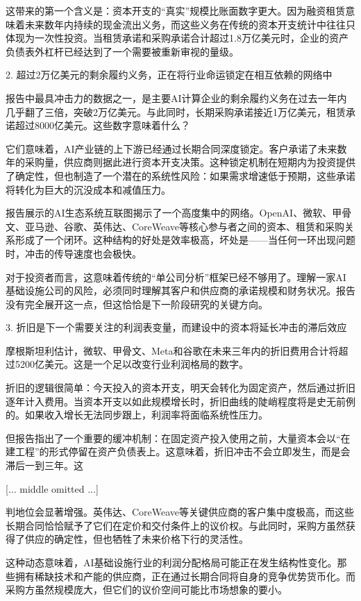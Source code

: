 \documentclass[11pt]{ctexart}
\begin{document}
这带来的第一个含义是：资本开支的“真实”规模比账面数字更大。因为融资租赁意味着未来数年内持续的现金流出义务，而这些义务在传统的资本开支统计中往往只体现为一次性投资。当租赁承诺和采购承诺合计超过1.8万亿美元时，企业的资产负债表外杠杆已经达到了一个需要被重新审视的量级。

2. 超过2万亿美元的剩余履约义务，正在将行业命运锁定在相互依赖的网络中

报告中最具冲击力的数据之一，是主要AI计算企业的剩余履约义务在过去一年内几乎翻了三倍，突破2万亿美元。与此同时，长期采购承诺接近1万亿美元，租赁承诺超过8000亿美元。这些数字意味着什么？

它们意味着，AI产业链的上下游已经通过长期合同深度锁定。客户承诺了未来数年的采购量，供应商则据此进行资本开支决策。这种锁定机制在短期内为投资提供了确定性，但也制造了一个潜在的系统性风险：如果需求增速低于预期，这些承诺将转化为巨大的沉没成本和减值压力。

报告展示的AI生态系统互联图揭示了一个高度集中的网络。OpenAI、微软、甲骨文、亚马逊、谷歌、英伟达、CoreWeave等核心参与者之间的资本、租赁和采购关系形成了一个闭环。这种结构的好处是效率极高，坏处是——当任何一环出现问题时，冲击的传导速度也会极快。

对于投资者而言，这意味着传统的“单公司分析”框架已经不够用了。理解一家AI基础设施公司的风险，必须同时理解其客户和供应商的承诺规模和财务状况。报告没有完全展开这一点，但这恰恰是下一阶段研究的关键方向。

3. 折旧是下一个需要关注的利润表变量，而建设中的资本将延长冲击的滞后效应

摩根斯坦利估计，微软、甲骨文、Meta和谷歌在未来三年内的折旧费用合计将超过5200亿美元。这是一个足以改变行业利润格局的数字。

折旧的逻辑很简单：今天投入的资本开支，明天会转化为固定资产，然后通过折旧逐年计入费用。当资本开支以如此规模增长时，折旧曲线的陡峭程度将是史无前例的。如果收入增长无法同步跟上，利润率将面临系统性压力。

但报告指出了一个重要的缓冲机制：在固定资产投入使用之前，大量资本会以“在建工程”的形式停留在资产负债表上。这意味着，折旧冲击不会立即发生，而是会滞后一到三年。这

[... middle omitted ...]

判地位会显著增强。英伟达、CoreWeave等关键供应商的客户集中度极高，而这些长期合同恰恰赋予了它们在定价和交付条件上的议价权。与此同时，采购方虽然获得了供应的确定性，但也牺牲了未来价格下行的灵活性。

这种动态意味着，AI基础设施行业的利润分配格局可能正在发生结构性变化。那些拥有稀缺技术和产能的供应商，正在通过长期合同将自身的竞争优势货币化。而采购方虽然规模庞大，但它们的议价空间可能比市场想象的要小。
\end{document}
